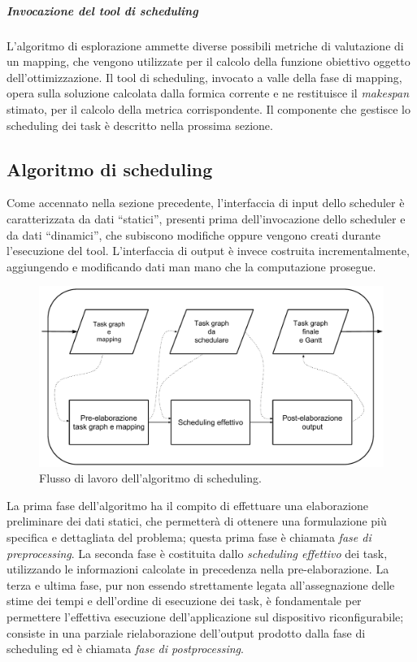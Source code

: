 \subparagraph{Invocazione del tool di scheduling}
L'algoritmo di esplorazione ammette diverse possibili metriche di valutazione
di un mapping, che vengono utilizzate per il calcolo della funzione obiettivo
oggetto dell'ottimizzazione. Il tool di scheduling, invocato a valle della fase di mapping, opera sulla
soluzione calcolata dalla formica corrente e ne restituisce il \emph{makespan} stimato, per
il calcolo della metrica corrispondente. Il componente che gestisce lo scheduling
dei task \`e descritto nella prossima sezione.

\subsection{Algoritmo di scheduling}
\label{subsec:algoScheduling}
Come accennato nella sezione precedente, l'interfaccia di input dello scheduler è 
caratterizzata da dati ``statici'', presenti prima dell'invocazione dello 
scheduler e da dati ``dinamici'', che subiscono modifiche oppure vengono creati 
durante l'esecuzione del tool. L'interfaccia di output è invece costruita 
incrementalmente, aggiungendo e modificando dati man mano che la computazione 
prosegue.


\begin{figure}[ht]
 \begin{center}
\includegraphics[width=\textwidth]
{capitoli/figure/cap4/SchedulerWorkflow.pdf}
  \caption{Flusso di lavoro dell'algoritmo di scheduling.}
  \label{fig:schedulerWorkflow}
 \end{center}
\end{figure}


La prima fase dell'algoritmo ha il compito di 
effettuare una elaborazione preliminare dei dati statici, che permetterà di 
ottenere una formulazione più specifica e dettagliata del problema; questa 
prima fase è chiamata \emph{fase di preprocessing}. La seconda fase è 
costituita dallo \emph{scheduling effettivo} dei task, utilizzando le 
informazioni calcolate in precedenza nella pre-elaborazione. La terza e ultima 
fase, pur non essendo strettamente legata all'assegnazione delle stime dei tempi 
e dell'ordine di esecuzione dei task, è fondamentale per permettere l'effettiva 
esecuzione dell'applicazione sul dispositivo riconfigurabile; consiste in una 
parziale rielaborazione dell'output prodotto dalla fase di scheduling ed è 
chiamata \emph{fase di postprocessing}.

